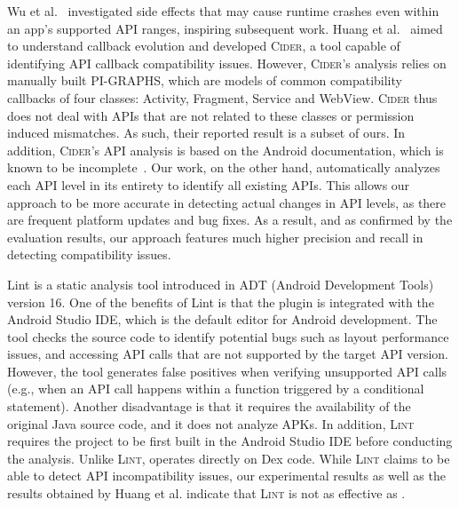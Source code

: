 Wu et al.~\cite{wu2017measuring} investigated side
effects that may cause runtime crashes even within an
app's supported API ranges, inspiring subsequent work.
%
Huang et al.~\cite{huang2018understanding} aimed to
understand callback evolution and developed
\textsc{Cider}, a tool capable of identifying API
callback compatibility issues. However,
\textsc{Cider}'s analysis relies on manually built
PI-GRAPHS, which are models of common compatibility
callbacks of four classes: Activity, Fragment, Service
and WebView. \textsc{Cider} thus does not deal with
APIs that are not related to these classes or
permission induced mismatches. 
As such, their reported result is a subset of ours. In
addition, \textsc{Cider}'s API analysis is based on the
Android documentation, which is known to be
incomplete~\cite{wu2017measuring}. Our work, on the
other hand, automatically analyzes each API level in
its entirety to identify all existing APIs. This allows
our approach to be more accurate in detecting actual
changes in API levels, as there are frequent platform
updates and bug fixes. As a result, and as confirmed by
the evaluation results, our approach features much
higher precision and recall in detecting compatibility
issues.

Lint \cite{linttips} is a static analysis tool
introduced in ADT (Android Development Tools) version
16. One of the benefits of Lint is that the plugin is
integrated with the Android Studio IDE, which is the
default editor for Android development. The tool checks
the source code to identify potential bugs such as
layout performance issues, and accessing API calls that
are not supported by the target API version. However,
the tool generates false positives when verifying
unsupported API calls (e.g., when an API call happens
within a function triggered by a conditional
statement). Another disadvantage is that it requires
the availability of the original Java source code, and
it does not analyze APKs.  In addition, \textsc{Lint}
requires the project to be first built in the Android
Studio IDE before conducting the analysis.  Unlike
\textsc{Lint}, \@approach operates directly on Dex
code. While \textsc{Lint} claims to be able to detect
API incompatibility issues, our experimental results as
well as the results obtained by Huang et al.  indicate
that \textsc{Lint} is not as effective as \@approach. %

